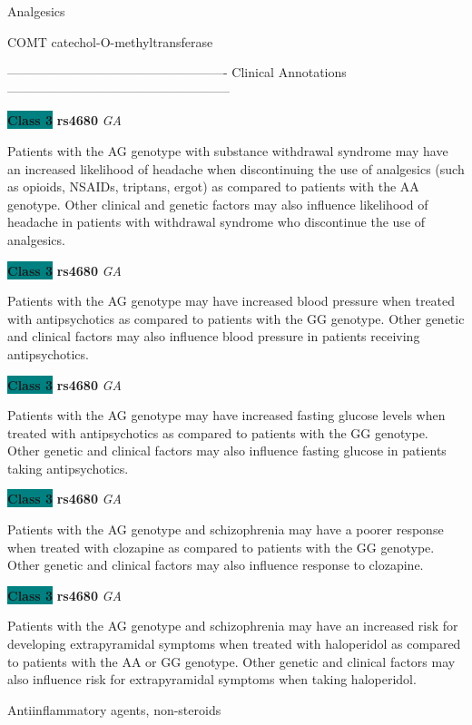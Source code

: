 \documentclass{resume} %
\begin{document}
\begin{rSection}{ Analgesics }
\begin{rSubsection}{ COMT }{ catechol-O-methyltransferase }{}{}
\item[] ---------------------------------------------------- Clinical Annotations -----------------------------------------------------\newline
\item \textbf{\colorbox{teal} {Class 3}} \textbf{ rs4680 } \textit{ GA }
\item[] Patients with the AG genotype with substance withdrawal syndrome may have an increased likelihood of headache when discontinuing the use of analgesics (such as opioids, NSAIDs, triptans, ergot) as compared to patients with the AA genotype. Other clinical and genetic factors may also influence likelihood of headache in patients with withdrawal syndrome who discontinue the use of analgesics.\item \textbf{\colorbox{teal} {Class 3}} \textbf{ rs4680 } \textit{ GA }
\item[] Patients with the AG genotype may have increased blood pressure when treated with antipsychotics as compared to patients with the GG genotype. Other genetic and clinical factors may also influence blood pressure in patients receiving antipsychotics.\item \textbf{\colorbox{teal} {Class 3}} \textbf{ rs4680 } \textit{ GA }
\item[] Patients with the AG genotype may have increased fasting glucose levels when treated with antipsychotics as compared to patients with the GG genotype. Other genetic and clinical factors may also influence fasting glucose in patients taking antipsychotics.\item \textbf{\colorbox{teal} {Class 3}} \textbf{ rs4680 } \textit{ GA }
\item[] Patients with the AG genotype and schizophrenia may have a poorer response when treated with clozapine as compared to patients with the GG genotype. Other genetic and clinical factors may also influence response to clozapine.\item \textbf{\colorbox{teal} {Class 3}} \textbf{ rs4680 } \textit{ GA }
\item[] Patients with the AG genotype and schizophrenia may have an increased risk for developing extrapyramidal symptoms when treated with haloperidol as compared to patients with the AA or GG genotype. Other genetic and clinical factors may also influence risk for extrapyramidal symptoms when taking haloperidol.
\end{rSubsection}

\end{rSection}\begin{rSection}{ Antiinflammatory agents, non-steroids }
\item[]


\end{rSection}
\end{document}
